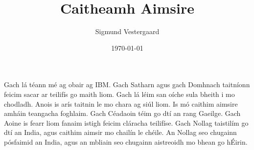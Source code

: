 \documentclass[article,a4paper,oneside,12pt]{memoir}
\title{\textbf{Caitheamh Aimsire}}
\author{Sigmund Vestergaard}
\date{\today}
\begin{document}
\maketitle

Gach lá t\'{e}ann m\'{e} ag obair ag IBM.
Gach Satharn agus gach Domhnach taitníonn feicim sacar ar teilifís go maith
liom. Gach lá l\'{e}im san oíche sula bheith i mo chodladh. Anois is arís
taitnin le mo chara ag siúl liom. Is mó caithim aimsire amháin teangacha
foghlaim. Gach C\'{e}adaoin t\'{e}im go dtí an rang Gaeilge. Gach Aoine is
fearr liom fanaim istigh feicim cláracha teilifíse. Gach Nollag taistilím go
dtí an India, agus caithim aimsir mo chailín le ch\'{e}ile. An Nollag seo
chugainn pósfaimid an India, agus an mbliain seo chugainn aistreoidh mo bhean
go h\'{E}irin.
\end{document}
